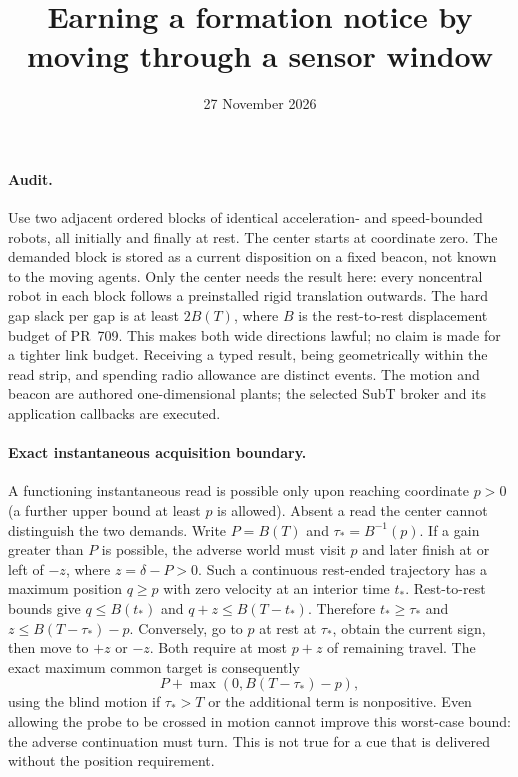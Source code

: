 \documentclass[11pt]{article}
\title{Earning a formation notice by moving through a sensor window}
\date{27 November 2026}
\begin{document}
\maketitle
\paragraph{Audit.}
Use two adjacent ordered blocks of identical
acceleration- and speed-bounded robots, all initially and finally
at rest. The center starts at coordinate zero. The demanded block
is stored as a current disposition on a fixed beacon, not known
to the moving agents. Only the center needs the result here:
every noncentral robot in each block follows a preinstalled
rigid translation outwards. The hard gap slack per gap is
at least \(2B(T)\), where \(B\) is the rest-to-rest displacement
budget of PR~709. This makes both wide directions lawful; no
claim is made for a tighter link budget. Receiving a typed result,
being geometrically within the read strip, and spending radio
allowance are distinct events. The motion and beacon are authored
one-dimensional plants; the selected SubT broker and its
application callbacks are executed.

\paragraph{Exact instantaneous acquisition boundary.}
A functioning instantaneous read is possible only upon reaching
coordinate \(p>0\) (a further upper bound at least \(p\) is
allowed). Absent a read the center cannot distinguish the
two demands. Write \(P=B(T)\) and
\(\tau_* = B^{-1}(p)\). If a gain greater than \(P\) is possible,
the adverse world must visit \(p\) and later finish at or left
of \(-z\), where \(z=\delta-P>0\). Such a continuous rest-ended
trajectory has a maximum position \(q\ge p\) with zero velocity
at an interior time \(t_*\). Rest-to-rest bounds give
\(q\le B(t_*)\) and \(q+z\le B(T-t_*)\). Therefore \(t_*\ge\tau_*\)
and \(z\le B(T-\tau_*)-p\). Conversely, go to \(p\) at rest at
\(\tau_*\), obtain the current sign, then move to \(+z\) or
\(-z\). Both require at most \(p+z\) of remaining travel.
The exact maximum common target is consequently
\[
             P+\max(0,B(T-\tau_*)-p),
\]
using the blind motion if \(\tau_*>T\) or the additional
term is nonpositive. Even allowing the probe to be crossed in
motion cannot improve this worst-case bound: the adverse
continuation must turn. This is not true for a cue that is
delivered without the position requirement.
\end{document}
